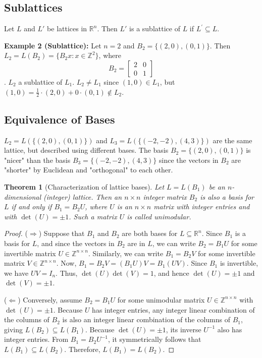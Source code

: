 \documentclass[12pt, a4paper]{article}
\theoremstyle{definition}
\theoremstyle{plain}
\newtheorem{theorem}{Theorem}[section]
\begin{document}
\subsection{Sublattices}
Let $L$ and $L'$ be lattices in $\mathbb{R}^{n}$. Then $L'$ is a sublattice of $L$ if $L^{\prime}\subseteq L$.

\textbf{Example 2 (Sublattice):}
Let $n=2$ and $B_{2}=\{(2,0),(0,1)\}$. Then $L_{2}=L(B_{2})=\{B_{2}x:x\in\mathbb{Z}^{2}\}$, where 
$$B_{2}=\begin{bmatrix}2&0\\ 0&1\end{bmatrix}$$. $L_{2}$ a sublattice of $L_{1}$. $L_{2}\ne L_{1}$ since $(1,0)\in L_{1}$, but $(1,0)=\frac{1}{2}\cdot(2,0)+0\cdot(0,1)\notin L_{2}$.

\subsection{Equivalence of Bases}
$L_{2}=L(\{(2,0),(0,1)\})$ and $L_{3}=L(\{(-2,-2),(4,3)\})$ are the same lattice, but described using different bases. The basis $B_{2}=\{(2,0),(0,1)\}$ is "nicer" than the basis $B_{3}=\{(-2,-2), (4,3)\}$ since the vectors in $B_{2}$ are "shorter" by Euclidean and "orthogonal" to each other.

\begin{theorem}[Characterization of lattice bases]
Let $L=L(B_{1})$ be an $n$-dimensional (integer) lattice. Then an $n\times n$ integer matrix $B_{2}$ is also a basis for $L$ if and only if $B_{1}=B_{2}U$, where $U$ is an $n\times n$ matrix with integer entries and with $\det(U)=\pm1$. Such a matrix $U$ is called unimodular.
\end{theorem}
\begin{proof}
($\Rightarrow$) Suppose that $B_{1}$ and $B_{2}$ are both bases for $L\subseteq\mathbb{R}^{n}$. Since $B_{1}$ is a basis for $L$, and since the vectors in $B_{2}$ are in $L$, we can write $B_{2}=B_{1}U$ for some invertible matrix $U\in\mathbb{Z}^{n\times n}$. Similarly, we can write $B_{1}=B_{2}V$ for some invertible matrix $V\in\mathbb{Z}^{n\times n}$. Now, $B_{1}=B_{2}V=(B_{1}U)V=B_{1}(UV)$. Since $B_{1}$ is invertible, we have $UV=I_{n}$. Thus, $\det(U)\det(V)=1$, and hence $\det(U)=\pm1$ and $\det(V)=\pm1$.

($\Leftarrow$) Conversely, assume $B_{2}=B_{1}U$ for some unimodular matrix $U \in \mathbb{Z}^{n \times n}$ with $\det(U)=\pm1$. Because $U$ has integer entries, any integer linear combination of the columns of $B_2$ is also an integer linear combination of the columns of $B_1$, giving $L(B_{2}) \subseteq L(B_{1})$. Because $\det(U)=\pm1$, its inverse $U^{-1}$ also has integer entries. From $B_{1}=B_{2}U^{-1}$, it symmetrically follows that $L(B_{1}) \subseteq L(B_{2})$. Therefore, $L(B_{1}) = L(B_{2})$.
\end{proof}
\end{document}

